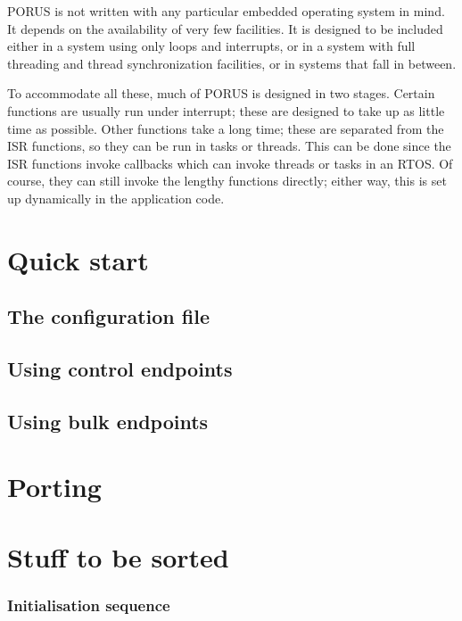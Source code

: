\documentclass[a4paper]{book}
\newcommand{\porus}{PORUS }
\begin{document}
\porus is not written with any particular embedded operating system in mind.  It depends on the availability of very few facilities.  It is designed to be included either in a system using only loops and interrupts, or in a system with full threading and thread synchronization facilities, or in systems that fall in between.

To accommodate all these, much of \porus is designed in two stages.  Certain functions are usually run under interrupt; these are designed to take up as little time as possible.  Other functions take a long time; these are separated from the ISR functions, so they can be run in tasks or threads.  This can be done since the ISR functions invoke callbacks which can invoke threads or tasks in an RTOS.  Of course, they can still invoke the lengthy functions directly; either way, this is set up dynamically in the application code.

\chapter{Quick start}

\section{The configuration file}

\section{Using control endpoints}

\section{Using bulk endpoints}

\chapter{Porting}


\chapter{Stuff to be sorted}

\subsection{Initialisation sequence}
\end{document}
